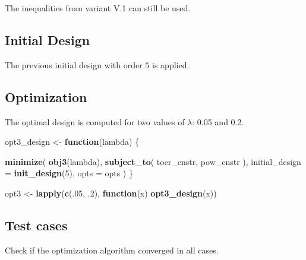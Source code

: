 \documentclass[]{book}
\newenvironment{Shaded}{\begin{snugshade}}{\end{snugshade}}
\newcommand{\ControlFlowTok}[1]{\textcolor[rgb]{0.13,0.29,0.53}{\textbf{#1}}}
\newcommand{\DataTypeTok}[1]{\textcolor[rgb]{0.13,0.29,0.53}{#1}}
\newcommand{\DecValTok}[1]{\textcolor[rgb]{0.00,0.00,0.81}{#1}}
\newcommand{\FloatTok}[1]{\textcolor[rgb]{0.00,0.00,0.81}{#1}}
\newcommand{\KeywordTok}[1]{\textcolor[rgb]{0.13,0.29,0.53}{\textbf{#1}}}
\newcommand{\NormalTok}[1]{#1}
\newcommand{\OperatorTok}[1]{\textcolor[rgb]{0.81,0.36,0.00}{\textbf{#1}}}
\newcommand{\StringTok}[1]{\textcolor[rgb]{0.31,0.60,0.02}{#1}}
\begin{document}
The inequalities from variant V.1 can still be used.

\hypertarget{initial-design-10}{%
\subsection{Initial Design}\label{initial-design-10}}

The previous initial design with order \(5\) is applied.

\hypertarget{optimization-11}{%
\subsection{Optimization}\label{optimization-11}}

The optimal design is computed for two values of \(\lambda\): 0.05 and 0.2.

\begin{Shaded}
\begin{Highlighting}[]
\NormalTok{opt3_design <-}\StringTok{ }\ControlFlowTok{function}\NormalTok{(lambda) \{}

    \KeywordTok{minimize}\NormalTok{(}
        \KeywordTok{obj3}\NormalTok{(lambda),}
        \KeywordTok{subject_to}\NormalTok{(}
\NormalTok{            toer_cnstr,}
\NormalTok{            pow_cnstr}
\NormalTok{        ),}
        \DataTypeTok{initial_design =} \KeywordTok{init_design}\NormalTok{(}\DecValTok{5}\NormalTok{),}
        \DataTypeTok{opts =}\NormalTok{ opts}
\NormalTok{    )}
\NormalTok{\}}

\NormalTok{opt3 <-}\StringTok{ }\KeywordTok{lapply}\NormalTok{(}\KeywordTok{c}\NormalTok{(.}\DecValTok{05}\NormalTok{, }\FloatTok{.2}\NormalTok{), }\ControlFlowTok{function}\NormalTok{(x) }\KeywordTok{opt3_design}\NormalTok{(x))}
\end{Highlighting}
\end{Shaded}

\hypertarget{test-cases-12}{%
\subsection{Test cases}\label{test-cases-12}}

Check if the optimization algorithm converged in all cases.

\begin{Shaded}
\end{Shaded}
\end{document}
